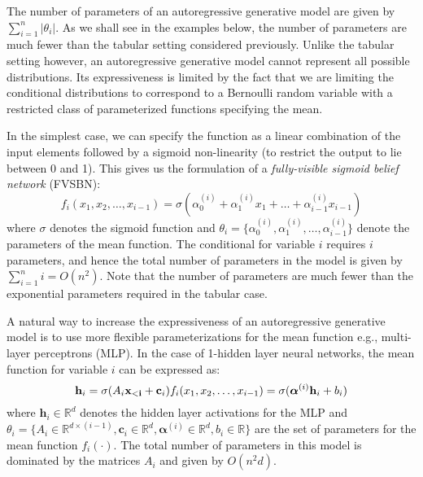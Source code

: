 The number of parameters of an autoregressive generative model are given by $\sum_{i=1}^n \vert \theta_i \vert$. As we shall see in the examples below, the number of parameters are much fewer than the tabular setting considered previously. Unlike the tabular setting however, an autoregressive generative model cannot represent all possible distributions. Its expressiveness is limited by the fact that we are limiting the conditional distributions to correspond to a Bernoulli random variable with a restricted class of parameterized functions specifying the mean.

In the simplest case, we can specify the function as a linear combination of the input elements followed by a sigmoid non-linearity (to restrict the output to lie between 0 and 1). This gives us the formulation of a \textit{fully-visible sigmoid belief network} (FVSBN):
\[
f_i(x_1, x_2, \ldots, x_{i-1}) =\sigma(\alpha^{(i)}_0 + \alpha^{(i)}_1 x_1 + \ldots + \alpha^{(i)}_{i-1} x_{i-1})  
\]
where $\sigma$ denotes the sigmoid function and $\theta_i=\{\alpha^{(i)}_0,\alpha^{(i)}_1, \ldots, \alpha^{(i)}_{i-1}\}$ denote the parameters of the mean function. The conditional for variable $i$ requires $i$
 parameters, and hence the total number of parameters in the model is given by $\sum_{i=1}^ni= O(n^2)$.  Note that the number of parameters are much fewer than the exponential parameters required in the tabular case.

A natural way to increase the expressiveness of an autoregressive generative model is to use more flexible parameterizations for the mean function e.g., multi-layer perceptrons (MLP). In the case of 1-hidden layer neural networks, the mean function for variable $i$ can be expressed as:
\[
\mathbf{h}_i = \sigma(A_i \mathbf{x_{<i}} + \mathbf{c}_i)\\
f_i(x_1, x_2, \ldots, x_{i-1}) =\sigma(\boldsymbol{\alpha}^{(i)}\mathbf{h}_i +b_i )  
\]
where $\mathbf{h}_i \in \mathbb{R}^d$ denotes the hidden layer activations for the MLP and$\theta_i = \{A_i \in \mathbb{R}^{d\times (i-1)},  \mathbf{c}_i \in \mathbb{R}^d, \boldsymbol{\alpha}^{(i)}\in \mathbb{R}^d, b_i \in \mathbb{R}\}$ are the set of parameters for the mean function $f_i(\cdot)$.  The total number of parameters in this model is dominated by the matrices $A_i$ and given by $O(n^2 d)$. 

